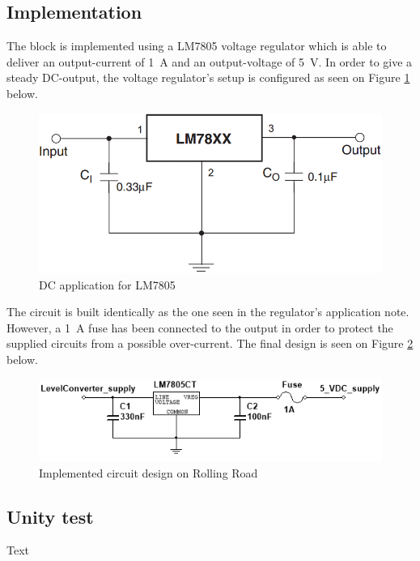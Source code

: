 \subsection{Implementation}
The block is implemented using a LM7805 voltage regulator which is able to deliver an output-current of \SI{1}{\ampere} and an output-voltage of \SI{5}{\volt}. In order to give a steady DC-output, the voltage regulator's setup is configured as seen on Figure \ref{fig:LM7805_app} below.

\begin{figure}[H]
	\centering
	\includegraphics[width=0.4\linewidth]{Hardware/Pictures/LM7805}
	\caption{DC application for LM7805}
	\label{fig:LM7805_app}
\end{figure}

The circuit is built identically as the one seen in the regulator's application note. However, a \SI{1}{\ampere} fuse has been connected to the output in order to protect the supplied circuits from a possible over-current. The final design is seen on Figure \ref{fig:DesignLevelConverter} below.

\begin{figure}[H]
	\centering
	\includegraphics[width=0.7\linewidth]{Hardware/Pictures/DesignLevelConverter}
	\caption{Implemented circuit design on Rolling Road}
	\label{fig:DesignLevelConverter}
\end{figure}

\subsection{Unity test}
Text